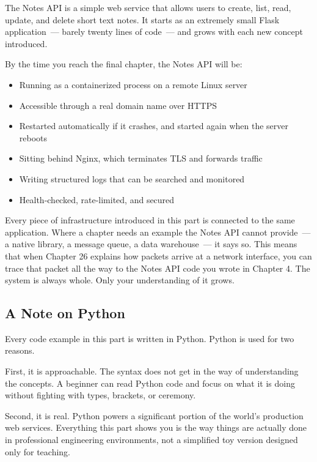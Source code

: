 The Notes API is a simple web service that allows users to create, list, read, update, and delete short text notes. It starts as an extremely small Flask application~--- barely twenty lines of code~--- and grows with each new concept introduced.

By the time you reach the final chapter, the Notes API will be:

\begin{itemize}
\tightlist
\item
  Running as a containerized process on a remote Linux server
\item
  Accessible through a real domain name over HTTPS
\item
  Restarted automatically if it crashes, and started again when the server reboots
\item
  Sitting behind Nginx, which terminates TLS and forwards traffic
\item
  Writing structured logs that can be searched and monitored
\item
  Health-checked, rate-limited, and secured
\end{itemize}

\noindent{}Every piece of infrastructure introduced in this part is connected to the same application. Where a chapter needs an example the Notes API cannot provide~--- a native library, a message queue, a data warehouse~--- it says so. This means that when Chapter 26 explains how packets arrive at a network interface, you can trace that packet all the way to the Notes API code you wrote in Chapter 4. The system is always whole. Only your understanding of it grows.

\subsection*{A Note on Python}\label{part4-introduction:a-note-on-python}

Every code example in this part is written in Python. Python is used for two reasons.

First, it is approachable. The syntax does not get in the way of understanding the concepts. A beginner can read Python code and focus on what it is doing without fighting with types, brackets, or ceremony.

Second, it is real. Python powers a significant portion of the world's production web services. Everything this part shows you is the way things are actually done in professional engineering environments, not a simplified toy version designed only for teaching.

